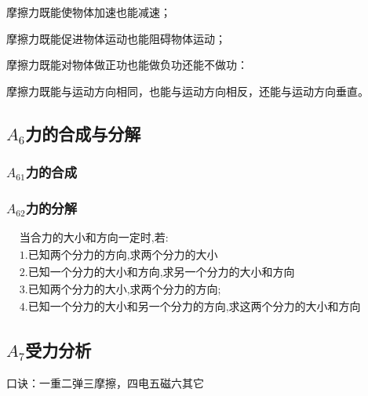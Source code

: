 \documentclass[lang=cn,10pt]{elegantbook}
\begin{document}
	摩擦力既能使物体加速也能减速；
	
	摩擦力既能促进物体运动也能阻碍物体运动；
	
	摩擦力既能对物体做正功也能做负功还能不做功：
	
	摩擦力既能与运动方向相同，也能与运动方向相反，还能与运动方向垂直。
	\subsection{$A_{6}$力的合成与分解}
	\subsubsection{$A_{61}$力的合成}
	\vspace{4cm}
	\subsubsection{$A_{62}$力的分解}
	$\begin{aligned}&\text{当合力的大小和方向一定时,若:}\\&1.\text{已知两个分力的方向,求两个分力的大小}\\&2.\text{已知一个分力的大小和方向,求另一个分力的大小和方向}\\&3.\text{已知两个分力的大小,求两个分力的方向};\\&4.\text{已知一个分力的大小和另一个分力的方向,求这两个分力的大小和方向}\end{aligned}$
	\vspace{3cm}
	\subsection{$A_{7}$受力分析}
	口诀：一重二弹三摩擦，四电五磁六其它
	
\end{document}
